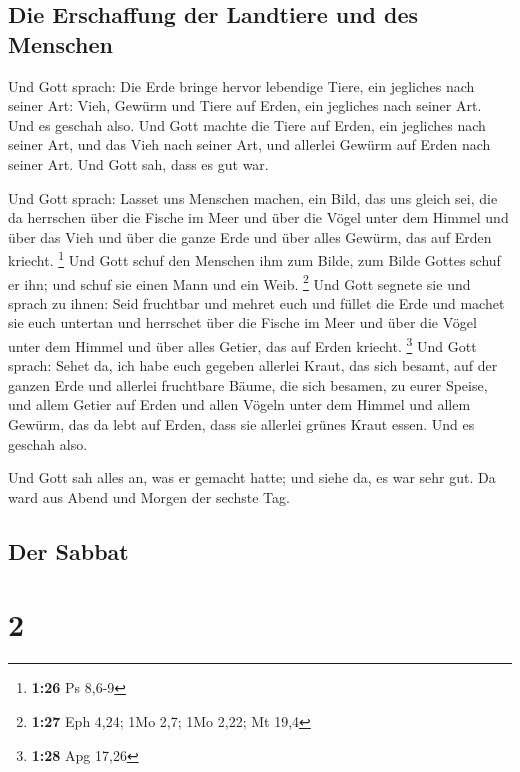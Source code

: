 \hypertarget{die-erschaffung-der-landtiere-und-des-menschen}{%
\subsection{Die Erschaffung der Landtiere und des
Menschen}\label{die-erschaffung-der-landtiere-und-des-menschen}}

 Und Gott sprach: Die Erde bringe hervor lebendige Tiere,
ein jegliches nach seiner Art: Vieh, Gewürm und Tiere auf Erden, ein
jegliches nach seiner Art. Und es geschah also.  Und Gott
machte die Tiere auf Erden, ein jegliches nach seiner Art, und das Vieh
nach seiner Art, und allerlei Gewürm auf Erden nach seiner Art. Und Gott
sah, dass es gut war.

 Und Gott sprach: Lasset uns Menschen machen, ein Bild,
das uns gleich sei, die da herrschen über die Fische im Meer und über
die Vögel unter dem Himmel und über das Vieh und über die ganze Erde und
über alles Gewürm, das auf Erden kriecht. \footnote{\textbf{1:26} Ps
  8,6-9}  Und Gott schuf den Menschen ihm zum Bilde, zum
Bilde Gottes schuf er ihn; und schuf sie einen Mann und ein Weib.
\footnote{\textbf{1:27} Eph 4,24; 1Mo 2,7; 1Mo 2,22; Mt 19,4}
 Und Gott segnete sie und sprach zu ihnen: Seid fruchtbar
und mehret euch und füllet die Erde und machet sie euch untertan und
herrschet über die Fische im Meer und über die Vögel unter dem Himmel
und über alles Getier, das auf Erden kriecht. \footnote{\textbf{1:28}
  Apg 17,26}  Und Gott sprach: Sehet da, ich habe euch
gegeben allerlei Kraut, das sich besamt, auf der ganzen Erde und
allerlei fruchtbare Bäume, die sich besamen, zu eurer Speise,
 und allem Getier auf Erden und allen Vögeln unter dem
Himmel und allem Gewürm, das da lebt auf Erden, dass sie allerlei grünes
Kraut essen. Und es geschah also.

 Und Gott sah alles an, was er gemacht hatte; und siehe
da, es war sehr gut. Da ward aus Abend und Morgen der sechste Tag.

\hypertarget{der-sabbat}{%
\subsection{Der Sabbat}\label{der-sabbat}}

\hypertarget{section-1}{%
\section{2}\label{section-1}}

